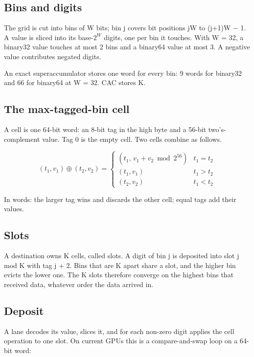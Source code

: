 \documentclass[journal]{IEEEtran}
\begin{document}
\hypertarget{bins-and-digits}{%
\subsection{Bins and digits}\label{bins-and-digits}}

The grid is cut into bins of W bits; bin j covers bit positions jW to
(j+1)W − 1. A value is sliced into its base-\(2^W\) digits, one per bin
it touches. With W = 32, a binary32 value touches at most 2 bins and a
binary64 value at most 3. A negative value contributes negated digits.

An exact superaccumulator stores one word for every bin: 9 words for
binary32 and 66 for binary64 at W = 32. CAC stores K.

\hypertarget{the-max-tagged-bin-cell}{%
\subsection{The max-tagged-bin cell}\label{the-max-tagged-bin-cell}}

A cell is one 64-bit word: an 8-bit tag in the high byte and a 56-bit
two's-complement value. Tag 0 is the empty cell. Two cells combine as
follows.

\[(t_1,v_1)\oplus(t_2,v_2)=\begin{cases}(t_1,\,v_1+v_2 \bmod 2^{56}) & t_1=t_2\\(t_1,v_1) & t_1>t_2\\(t_2,v_2) & t_1<t_2\end{cases}\]

In words: the larger tag wins and discards the other cell; equal tags
add their values.

\hypertarget{slots}{%
\subsection{Slots}\label{slots}}

A destination owns K cells, called slots. A digit of bin j is deposited
into slot j mod K with tag j + 2. Bins that are K apart share a slot,
and the higher bin evicts the lower one. The K slots therefore converge
on the highest bins that received data, whatever order the data arrived
in.

\hypertarget{deposit}{%
\subsection{Deposit}\label{deposit}}

A lane decodes its value, slices it, and for each non-zero digit applies
the cell operation to one slot. On current GPUs this is a
compare-and-swap loop on a 64-bit word:
\end{document}
